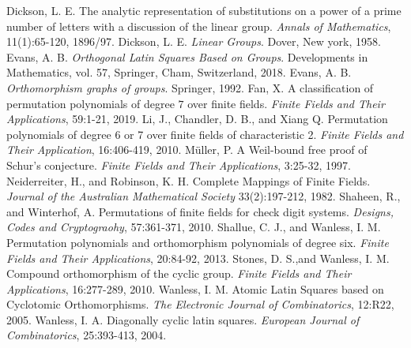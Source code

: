 \documentclass[12pt,a4wide, reqno]{amsart}
\theoremstyle{definition}
\theoremstyle{remark}
\numberwithin{equation}{section}
\begin{document}
\begin{thebibliography}{999}
Dickson, L. E. The analytic representation of substitutions on a power of a prime number of letters with a discussion of the linear group. \emph{Annals of Mathematics}, 11(1):65-120, 1896/97.
Dickson, L. E. \emph{Linear Groups}. Dover, New york, 1958.
Evans, A. B. \emph{Orthogonal Latin Squares Based on Groups}. Developments in Mathematics, vol. 57, Springer, Cham, Switzerland, 2018.
Evans, A. B. \emph{Orthomorphism graphs of groups}. Springer, 1992.
 Fan, X. A classification of permutation polynomials of degree $7$ over finite fields. \emph{Finite Fields and Their Applications}, 59:1-21, 2019.
 Li, J., Chandler, D. B., and Xiang Q. Permutation polynomials of degree 6 or 7 over finite fields of characteristic 2. \emph{Finite Fields and Their Application}, 16:406-419, 2010.
M\"{u}ller, P. A Weil-bound free proof of Schur's conjecture. \emph{Finite Fields and Their Applications}, 3:25-32, 1997.
Neiderreiter, H., and Robinson, K. H. Complete Mappings of Finite Fields. \emph{Journal of the Australian Mathematical Society} 33(2):197-212, 1982.
Shaheen, R., and Winterhof, A. Permutations of finite fields for check digit systems. \emph{Designs, Codes and Cryptograohy}, 57:361-371, 2010.
Shallue, C. J., and  Wanless, I. M. Permutation polynomials and orthomorphism polynomials of degree six. \emph{Finite Fields and Their Applications}, 20:84-92, 2013.
Stones, D. S.,and  Wanless, I. M. Compound orthomorphism of the cyclic group. \emph{Finite Fields and Their Applications}, 16:277-289, 2010.
Wanless, I. M. Atomic Latin Squares based on Cyclotomic Orthomorphisms. \emph{The Electronic Journal of Combinatorics}, 12:R22, 2005.
Wanless, I. A. Diagonally cyclic latin squares. \emph{European Journal of Combinatorics}, 25:393-413, 2004.
\end{thebibliography}
\end{document}
